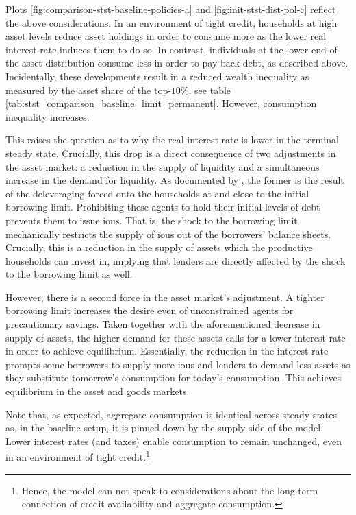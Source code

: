 \documentclass[12pt]{article} %
\numberwithin{equation}{section} %
\numberwithin{figure}{section}
\numberwithin{table}{section}
\begin{document}
Plots \ref{fig:comparison-stst-baseline-policies-a} and \ref{fig:init-stst-dist-pol-c} reflect the above considerations. In an environment of tight credit, households at high asset levels reduce asset holdings in order to consume more as the lower real interest rate induces them to do so. In contrast, individuals at the lower end of the asset distribution consume less in order to pay back debt, as described above. Incidentally, these developments result in a reduced wealth inequality as measured by the asset share of the top-$10\%$, see table \ref{tab:stst_comparison_baseline_limit_permanent}. However, consumption inequality increases.

This raises the question as to why the real interest rate is lower in the terminal steady state. Crucially, this drop is a direct consequence of two adjustments in the asset market: a reduction in the supply of liquidity and a simultaneous increase in the demand for liquidity. As documented by \textcite{gl2017}, the former is the result of the deleveraging forced onto the households at and close to the initial borrowing limit. Prohibiting these agents to hold their initial levels of debt prevents them to issue \Gls{iou}s. That is, the shock to the borrowing limit mechanically restricts the supply of \Gls{iou}s out of the borrowers' balance sheets. Crucially, this is a reduction in the supply of assets which the productive households can invest in, implying that lenders are directly affected by the shock to the borrowing limit as well.

However, there is a second force in the asset market's adjustment. A tighter borrowing limit increases the desire even of unconstrained agents for precautionary savings. Taken together with the aforementioned decrease in supply of assets, the higher demand for these assets calls for a lower interest rate in order to achieve equilibrium. Essentially, the reduction in the interest rate prompts some borrowers to supply more \Gls{iou}s and lenders to demand less assets as they substitute tomorrow's consumption for today's consumption. This achieves equilibrium in the asset and goods markets.


Note that, as expected, aggregate consumption is identical across steady states as, in the baseline setup, it is pinned down by the supply side of the model. Lower interest rates (and taxes) enable consumption to remain unchanged, even in an environment of tight credit.\footnote{Hence, the model can not speak to considerations about the long-term connection of credit availability and aggregate consumption.} %
\end{document}
